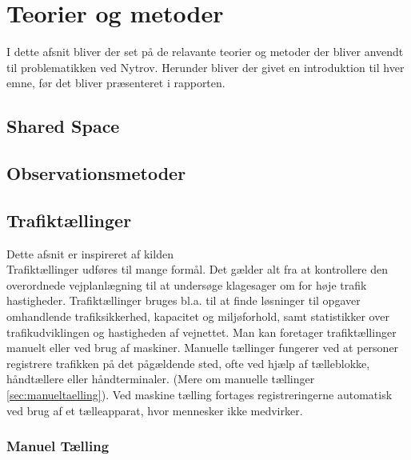 \chapter{Teorier og metoder}
\label{chap:teorier_og_metoder}
I dette afsnit bliver der set på de relavante teorier og metoder der bliver anvendt til problematikken ved Nytrov. Herunder bliver der givet en introduktion til hver emne, før det bliver præsenteret i rapporten.
\newpage
\section{Shared Space}
\label{sec:shared_space}

\section{Observationsmetoder}
\label{sec:observationsmetoder}

\section{Trafiktællinger}
\label{sec:trafiktaellinger}

Dette afsnit er inspireret af kilden %
\\
Trafiktællinger udføres til mange formål. Det gælder alt fra at kontrollere den overordnede vejplanlægning
til at undersøge klagesager om for høje trafik hastigheder. Trafiktællinger bruges bl.a. til at finde løsninger
til opgaver omhandlende trafiksikkerhed, kapacitet og miljøforhold, samt statistikker over trafikudviklingen
og hastigheden af vejnettet. Man kan foretager trafiktællinger manuelt eller ved brug af maskiner.
Manuelle tællinger fungerer ved at personer registrere trafikken på det pågældende sted, ofte ved hjælp af
tælleblokke, håndtællere eller håndterminaler. (Mere om manuelle tællinger \cref{sec:manueltaelling}). Ved maskine
tælling fortages registreringerne automatisk ved brug af et tælleapparat, hvor mennesker ikke medvirker.
\subsection{Manuel Tælling}
\label{subs:manueltaelling}

